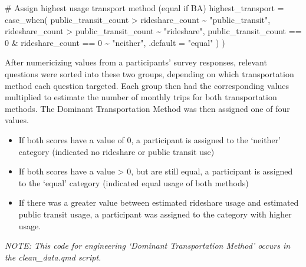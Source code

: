 \documentclass[
  11pt,
  letterpaper,
]{article}
\newenvironment{Shaded}{\begin{snugshade}}{\end{snugshade}}
\newcommand{\AttributeTok}[1]{\textcolor[rgb]{0.40,0.45,0.13}{#1}}
\newcommand{\CommentTok}[1]{\textcolor[rgb]{0.37,0.37,0.37}{#1}}
\newcommand{\DecValTok}[1]{\textcolor[rgb]{0.68,0.00,0.00}{#1}}
\newcommand{\FunctionTok}[1]{\textcolor[rgb]{0.28,0.35,0.67}{#1}}
\newcommand{\NormalTok}[1]{\textcolor[rgb]{0.00,0.23,0.31}{#1}}
\newcommand{\SpecialCharTok}[1]{\textcolor[rgb]{0.37,0.37,0.37}{#1}}
\newcommand{\StringTok}[1]{\textcolor[rgb]{0.13,0.47,0.30}{#1}}
\providecommand{\tightlist}{%
  \setlength{\itemsep}{0pt}\setlength{\parskip}{0pt}}
\begin{document}
\begin{Shaded}
\begin{Highlighting}[]
\CommentTok{\#   Assign highest usage transport method (equal if BA)}
    \AttributeTok{highest\_transport =} \FunctionTok{case\_when}\NormalTok{(}
\NormalTok{      public\_transit\_count }\SpecialCharTok{\textgreater{}}\NormalTok{ rideshare\_count }\SpecialCharTok{\textasciitilde{}} \StringTok{"public\_transit"}\NormalTok{,}
\NormalTok{      rideshare\_count }\SpecialCharTok{\textgreater{}}\NormalTok{ public\_transit\_count }\SpecialCharTok{\textasciitilde{}} \StringTok{"rideshare"}\NormalTok{,}
\NormalTok{      public\_transit\_count }\SpecialCharTok{==} \DecValTok{0} \SpecialCharTok{\&}\NormalTok{ rideshare\_count }\SpecialCharTok{==} \DecValTok{0} \SpecialCharTok{\textasciitilde{}} \StringTok{"neither"}\NormalTok{,}
      \AttributeTok{.default =} \StringTok{"equal"}\NormalTok{ )}
\NormalTok{    )}
\end{Highlighting}
\end{Shaded}

After numericizing values from a participants' survey responses,
relevant questions were sorted into these two groups, depending on which
transportation method each question targeted. Each group then had the
corresponding values multiplied to estimate the number of monthly trips
for both transportation methods. The Dominant Transportation Method was
then assigned one of four values.

\begin{itemize}
\tightlist
\item
  If both scores have a value of 0, a participant is assigned to the
  `neither' category (indicated no rideshare or public transit use)
\item
  If both scores have a value \textgreater{} 0, but are still equal, a
  participant is assigned to the `equal' category (indicated equal usage
  of both methods)
\item
  If there was a greater value between estimated rideshare usage and
  estimated public transit usage, a participant was assigned to the
  category with higher usage.
\end{itemize}

\emph{NOTE: This code for engineering `Dominant Transportation Method'
occurs in the clean\_data.qmd script.}
\end{document}
